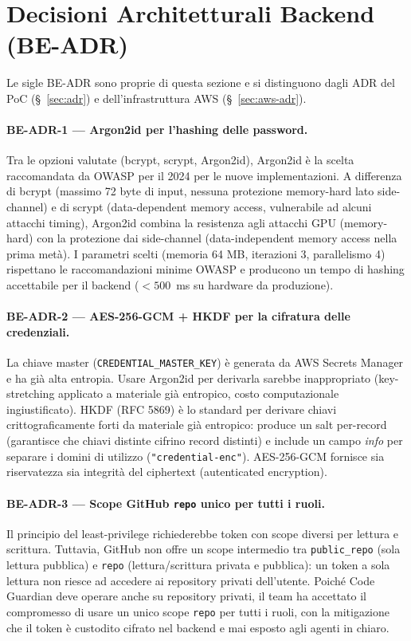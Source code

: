 \documentclass[11pt,a4paper]{article}
\begin{document}
\section{Decisioni Architetturali Backend (BE-ADR)}
\label{sec:be-adr}

Le sigle BE-ADR sono proprie di questa sezione e si distinguono dagli ADR del PoC (\S~\ref{sec:adr}) e dell'infrastruttura AWS (\S~\ref{sec:aws-adr}).

\paragraph{BE-ADR-1 --- Argon2id per l'hashing delle password.}
Tra le opzioni valutate (bcrypt, scrypt, Argon2id), Argon2id è la scelta raccomandata da OWASP per il 2024 per le nuove implementazioni. A differenza di bcrypt (massimo 72 byte di input, nessuna protezione memory-hard lato side-channel) e di scrypt (data-dependent memory access, vulnerabile ad alcuni attacchi timing), Argon2id combina la resistenza agli attacchi GPU (memory-hard) con la protezione dai side-channel (data-independent memory access nella prima metà). I parametri scelti (memoria 64 MB, iterazioni 3, parallelismo 4) rispettano le raccomandazioni minime OWASP e producono un tempo di hashing accettabile per il backend ($<500$~ms su hardware da produzione).

\paragraph{BE-ADR-2 --- AES-256-GCM + HKDF per la cifratura delle credenziali.}
La chiave master (\texttt{CREDENTIAL\_MASTER\_KEY}) è generata da AWS Secrets Manager e ha già alta entropia. Usare Argon2id per derivarla sarebbe inappropriato (key-stretching applicato a materiale già entropico, costo computazionale ingiustificato). HKDF (RFC 5869) è lo standard per derivare chiavi crittograficamente forti da materiale già entropico: produce un salt per-record (garantisce che chiavi distinte cifrino record distinti) e include un campo \emph{info} per separare i domini di utilizzo (\texttt{"credential-enc"}). AES-256-GCM fornisce sia riservatezza sia integrità del ciphertext (autenticated encryption).

\paragraph{BE-ADR-3 --- Scope GitHub \texttt{repo} unico per tutti i ruoli.}
Il principio del least-privilege richiederebbe token con scope diversi per lettura e scrittura. Tuttavia, GitHub non offre un scope intermedio tra \texttt{public\_repo} (sola lettura pubblica) e \texttt{repo} (lettura/scrittura privata e pubblica): un token a sola lettura non riesce ad accedere ai repository privati dell'utente. Poiché Code Guardian deve operare anche su repository privati, il team ha accettato il compromesso di usare un unico scope \texttt{repo} per tutti i ruoli, con la mitigazione che il token è custodito cifrato nel backend e mai esposto agli agenti in chiaro.
\end{document}
